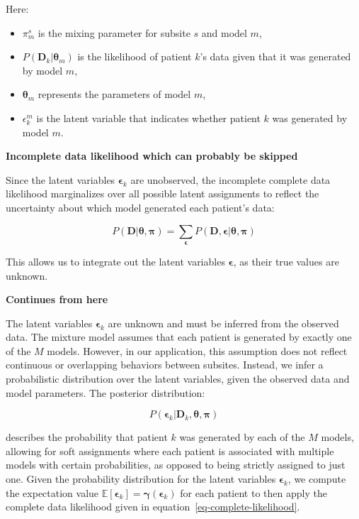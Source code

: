\documentclass[
  sn-mathphys-num,
]{sn-jnl}
\providecommand{\tightlist}{%
  \setlength{\itemsep}{0pt}\setlength{\parskip}{0pt}}\usepackage{longtable,booktabs,array}
\begin{document}
Here:

\begin{itemize}
\tightlist
\item
  \(\pi_m^s\) is the mixing parameter for subsite \(s\) and model \(m\),
\item
  \(P(\mathbf{D}_k | \boldsymbol{\theta}_m)\) is the likelihood of
  patient \(k\)'s data given that it was generated by model \(m\),
\item
  \(\boldsymbol{\theta}_m\) represents the parameters of model \(m\),
\item
  \(\epsilon_{k}^m\) is the latent variable that indicates whether
  patient \(k\) was generated by model \(m\).
\end{itemize}

\textbf{Incomplete data likelihood which can probably be skipped}

Since the latent variables \(\boldsymbol{\epsilon}_k\) are unobserved,
the incomplete complete data likelihood marginalizes over all possible
latent assignments to reflect the uncertainty about which model
generated each patient's data:

\[
P(\mathbf{D} | \boldsymbol{\theta}, \boldsymbol{\pi}) = \sum_{\boldsymbol{\epsilon}} P(\mathbf{D}, \boldsymbol{\epsilon} | \boldsymbol{\theta}, \boldsymbol{\pi})
\]

This allows us to integrate out the latent variables
\(\boldsymbol{\epsilon}\), as their true values are unknown.

\textbf{Continues from here}

The latent variables \(\boldsymbol{\epsilon}_k\) are unknown and must be
inferred from the observed data. The mixture model assumes that each
patient is generated by exactly one of the \(M\) models. However, in our
application, this assumption does not reflect continuous or overlapping
behaviors between subsites. Instead, we infer a probabilistic
distribution over the latent variables, given the observed data and
model parameters. The posterior distribution:

\[
P(\boldsymbol{\epsilon}_k | \mathbf{D}_k, \boldsymbol{\theta}, \boldsymbol{\pi})
\]

describes the probability that patient \(k\) was generated by each of
the \(M\) models, allowing for soft assignments where each patient is
associated with multiple models with certain probabilities, as opposed
to being strictly assigned to just one. Given the probability
distribution for the latent variables \(\boldsymbol{\epsilon}_k\), we
compute the expectation value
\(\mathbb{E}[\boldsymbol{\epsilon}_k] = \boldsymbol{\gamma}(\boldsymbol{\epsilon}_k)\)
for each patient to then apply the complete data likelihood given in
equation~\ref{eq-complete-likelihood}.
\end{document}
